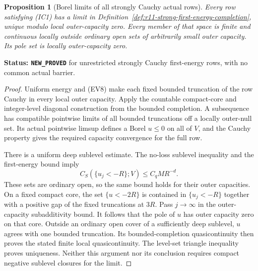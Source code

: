 \documentclass[11pt,a4paper]{article}
\numberwithin{equation}{section}
\newtheorem{proposition}[theorem]{Proposition}
\theoremstyle{definition}
\theoremstyle{remark}
\begin{document}
\begin{proposition}[Borel limits of all strongly Cauchy actual rows]
\label{prop:r11-strong-cauchy-borel-limit}
Every row satisfying (IC1) has a limit in
Definition~\ref{def:r11-strong-first-energy-completion}, unique
modulo local outer-capacity zero. Every member of that space is
finite and continuous locally outside ordinary open sets of
arbitrarily small outer capacity. Its pole set is locally
outer-capacity zero.
\end{proposition}

\noindent\textbf{Status: \texttt{NEW\_PROVED}} for unrestricted
strongly Cauchy first-energy rows, with no common actual barrier.

\begin{proof}
Uniform energy and (EV8) make each fixed bounded truncation
of the row Cauchy in every local outer capacity. Apply the
countable compact-core and integer-level diagonal construction
from the bounded completion. A subsequence has compatible
pointwise limits of all bounded truncations off a locally
outer-null set. Its actual pointwise limsup defines a Borel
$u\leq0$ on all of $V$, and the Cauchy property gives the
required capacity convergence for the full row.

There is a uniform deep sublevel estimate. The no-loss
sublevel inequality and the first-energy bound imply
\[
            C_S(\{u_j<-R\};V)\leq C_q M R^{-d}.
 \tag{IC9}
\]
These sets are ordinary open, so the same bound holds for
their outer capacities. On a fixed compact core, the set
$\{u<-2R\}$ is contained in $\{u_j<-R\}$ together with
a positive gap of the fixed truncations at $3R$.
Pass $j\to\infty$ in the outer-capacity subadditivity bound.
It follows that the pole of $u$ has outer capacity zero on
that core. Outside an ordinary open cover of a sufficiently
deep sublevel, $u$ agrees with one bounded truncation.
Its bounded-completion quasicontinuity then proves the stated
finite local quasicontinuity. The level-set triangle inequality
proves uniqueness. Neither this argument nor its conclusion
requires compact negative sublevel closures for the limit.
\end{proof}
\end{document}
